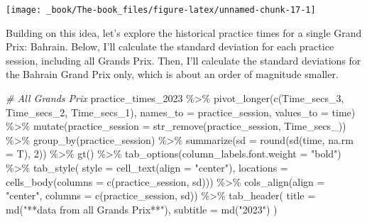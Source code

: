 \documentclass[
]{book}
\newenvironment{Shaded}{\begin{snugshade}}{\end{snugshade}}
\newcommand{\AttributeTok}[1]{\textcolor[rgb]{0.77,0.63,0.00}{#1}}
\newcommand{\CommentTok}[1]{\textcolor[rgb]{0.56,0.35,0.01}{\textit{#1}}}
\newcommand{\DecValTok}[1]{\textcolor[rgb]{0.00,0.00,0.81}{#1}}
\newcommand{\FunctionTok}[1]{\textcolor[rgb]{0.00,0.00,0.00}{#1}}
\newcommand{\NormalTok}[1]{#1}
\newcommand{\SpecialCharTok}[1]{\textcolor[rgb]{0.00,0.00,0.00}{#1}}
\newcommand{\StringTok}[1]{\textcolor[rgb]{0.31,0.60,0.02}{#1}}
\begin{document}
\begin{center}\texttt{[image: \_book/The-book\_files/figure-latex/unnamed-chunk-17-1]} \end{center}

Building on this idea, let's explore the historical practice times for a single Grand Prix: Bahrain. Below, I'll calculate the standard deviation for each practice session, including all Grands Prix. Then, I'll calculate the standard deviations for the Bahrain Grand Prix only, which is about an order of magnitude smaller.

\begin{Shaded}
\begin{Highlighting}[]
\CommentTok{\# All Grands Prix}
\NormalTok{practice\_times\_2023 }\SpecialCharTok{\%\textgreater{}\%}
  \FunctionTok{pivot\_longer}\NormalTok{(}\FunctionTok{c}\NormalTok{(Time\_secs\_3, Time\_secs\_2, Time\_secs\_1), }\AttributeTok{names\_to =} \StringTok{\textquotesingle{}practice\_session\textquotesingle{}}\NormalTok{, }\AttributeTok{values\_to =} \StringTok{\textquotesingle{}time\textquotesingle{}}\NormalTok{) }\SpecialCharTok{\%\textgreater{}\%}
  \FunctionTok{mutate}\NormalTok{(}\AttributeTok{practice\_session =} \FunctionTok{str\_remove}\NormalTok{(practice\_session, }\StringTok{\textquotesingle{}Time\_secs\_\textquotesingle{}}\NormalTok{)) }\SpecialCharTok{\%\textgreater{}\%}
  \FunctionTok{group\_by}\NormalTok{(practice\_session) }\SpecialCharTok{\%\textgreater{}\%} 
  \FunctionTok{summarize}\NormalTok{(}\AttributeTok{sd =} \FunctionTok{round}\NormalTok{(}\FunctionTok{sd}\NormalTok{(time, }\AttributeTok{na.rm =}\NormalTok{ T), }\DecValTok{2}\NormalTok{)) }\SpecialCharTok{\%\textgreater{}\%}
  \FunctionTok{gt}\NormalTok{() }\SpecialCharTok{\%\textgreater{}\%}
  \FunctionTok{tab\_options}\NormalTok{(}\AttributeTok{column\_labels.font.weight =} \StringTok{"bold"}\NormalTok{) }\SpecialCharTok{\%\textgreater{}\%}
  \FunctionTok{tab\_style}\NormalTok{(}
    \AttributeTok{style =} \FunctionTok{cell\_text}\NormalTok{(}\AttributeTok{align =} \StringTok{"center"}\NormalTok{),}
    \AttributeTok{locations =} \FunctionTok{cells\_body}\NormalTok{(}\AttributeTok{columns =} \FunctionTok{c}\NormalTok{(practice\_session, sd))) }\SpecialCharTok{\%\textgreater{}\%}
  \FunctionTok{cols\_align}\NormalTok{(}\AttributeTok{align =} \StringTok{"center"}\NormalTok{, }\AttributeTok{columns =} \FunctionTok{c}\NormalTok{(practice\_session, sd)) }\SpecialCharTok{\%\textgreater{}\%} 
  \FunctionTok{tab\_header}\NormalTok{(}
    \AttributeTok{title =} \FunctionTok{md}\NormalTok{(}\StringTok{"**data from all Grands Prix**"}\NormalTok{),}
    \AttributeTok{subtitle =} \FunctionTok{md}\NormalTok{(}\StringTok{"2023"}\NormalTok{)}
\NormalTok{  )}
\end{Highlighting}
\end{Shaded}
\end{document}

